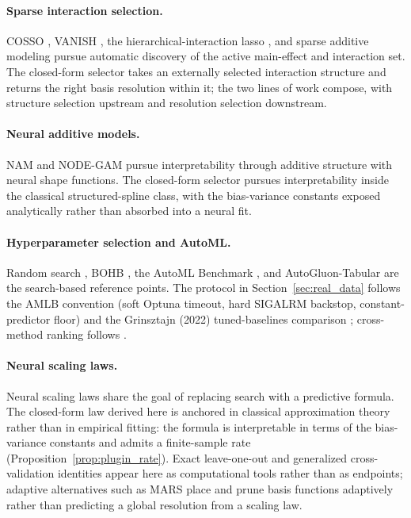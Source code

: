 \documentclass{article}
\begin{document}
\paragraph{Sparse interaction selection.}
COSSO \citep{lin2006cosso}, VANISH \citep{radchenko2010}, the hierarchical-interaction lasso \citep{bien2013}, and sparse additive modeling \citep{ravikumar2009} pursue automatic discovery of the active main-effect and interaction set. The closed-form selector takes an externally selected interaction structure and returns the right basis resolution within it; the two lines of work compose, with structure selection upstream and resolution selection downstream.

\paragraph{Neural additive models.}
NAM \citep{agarwal2021nam} and NODE-GAM \citep{chang2022nodegam} pursue interpretability through additive structure with neural shape functions. The closed-form selector pursues interpretability inside the classical structured-spline class, with the bias-variance constants exposed analytically rather than absorbed into a neural fit.

\paragraph{Hyperparameter selection and AutoML.}
Random search \citep{bergstra2012}, BOHB \citep{falkner2018bohb}, the AutoML Benchmark \citep{gijsbers2024amlb}, and AutoGluon-Tabular \citep{erickson2020autogluon} are the search-based reference points. The protocol in Section~\ref{sec:real_data} follows the AMLB convention (soft Optuna timeout, hard SIGALRM backstop, constant-predictor floor) and the Grinsztajn (2022) tuned-baselines comparison \citep{grinsztajn2022tree}; cross-method ranking follows \citet{demsar2006}.

\paragraph{Neural scaling laws.}
Neural scaling laws \citep{kaplan2020,hoffmann2022} share the goal of replacing search with a predictive formula. The closed-form law derived here is anchored in classical approximation theory rather than in empirical fitting: the formula is interpretable in terms of the bias-variance constants and admits a finite-sample rate (Proposition~\ref{prop:plugin_rate}). Exact leave-one-out and generalized cross-validation identities \citep{allen1974,craven1979,golub1979} appear here as computational tools rather than as endpoints; adaptive alternatives such as MARS \citep{friedman1991} place and prune basis functions adaptively rather than predicting a global resolution from a scaling law.
\end{document}
